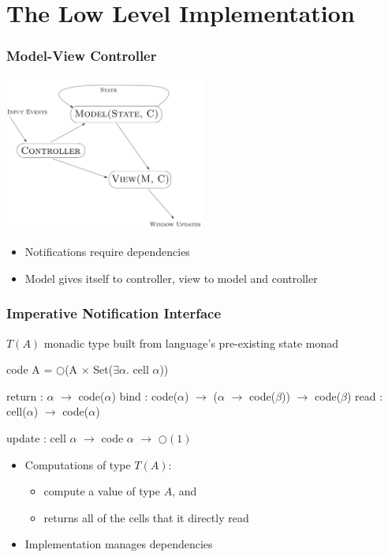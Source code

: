 \documentclass[svgnames]{beamer}
\begin{document}
\section{The Low Level Implementation}

\begin{frame}
  \frametitle{Model-View Controller}
 
  \begin{block}{}
    \begin{center}
    \includegraphics[height=2in]{mvc.pdf}
    \end{center}
  \end{block}

  \begin{itemize}
  \item Notifications require dependencies
  \item Model gives itself to controller, view to model and controller
  \end{itemize}
\end{frame}


\begin{frame}[fragile]
  \frametitle{Imperative Notification Interface}

  $T(A)$ monadic type built from language's pre-existing state monad
  \begin{block}{}
  \begin{semiverbatim}
    code A = \(\bigcirc\)(A \(\times\) Set(\(\exists \alpha.\) cell \(\alpha\)))
 
    return : \(\alpha\) \(\to\) code(\(\alpha\))
    bind   : code(\(\alpha\)) \(\to\) (\(\alpha\) \(\to\) code(\(\beta\))) \(\to\) code(\(\beta\))
    read   : cell(\(\alpha\)) \(\to\) code(\(\alpha\))

    update : cell \(\alpha\) \(\to\) code \(\alpha\) \(\to\) \(\bigcirc(1)\)
  \end{semiverbatim}
  \end{block}
  \begin{itemize}
    \item Computations of type $T(A)$:
      \indent\begin{itemize} 
        \item compute a value of type $A$, and
        \item returns all of the cells that it directly read
      \end{itemize}

    \item Implementation manages dependencies
  \end{itemize}
\end{frame}
\end{document}
